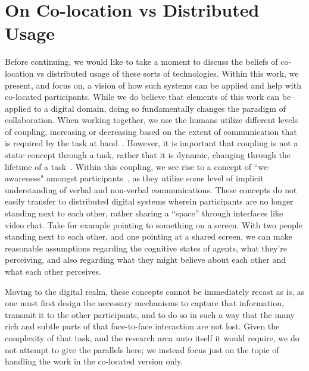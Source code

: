 \section{On Co-location vs Distributed Usage}

Before continuing, we would like to take a moment to discuss the
beliefs of co-location vs distributed usage of these sorts of
technologies. Within this work, we present, and focus on, a vision of
how such systems can be applied and help with co-located
participants. While we do believe that elements of this work can be
applied to a digital domain, doing so fundamentally changes the
paradigm of collaboration. When working together, we use the humans
utilize different levels of coupling, increasing or decreasing based
on the extent of communication that is required by the task at
hand~\cite{salvador_denver_1996,olson_distance_2000}. However, it is
important that coupling is not a static concept through a task, rather
that it is dynamic, changing through the lifetime of a
task~\cite{jakobsen_up_2014}.  Within this coupling, we see rise to a
concept of ``we-awareness" amongst
participants~\cite{greenberg_implications_2016}, as they utilize some
level of implicit understanding of verbal and non-verbal
communications. These concepts do not easily transfer to distributed
digital systems wherein participants are no longer standing next to
each other, rather sharing a ``space'' through interfaces like video
chat. Take for example pointing to something on a screen. With two
people standing next to each other, and one pointing at a shared
screen, we can make reasonable assumptions regarding the cognitive
states of agents, what they're perceiving, and also regarding what
they might believe about each other and what each other perceives.

Moving to the digital realm, these concepts cannot be immediately
recast as is, as one must first design the necessary mechanisms to
capture that information, transmit it to the other participants, and
to do so in such a way that the many rich and subtle parts of that
face-to-face interaction are not lost. Given the complexity of that
task, and the research area unto itself it would require, we do not
attempt to give the parallels here; we instead focus just on the topic
of handling the work in the co-located version only.

